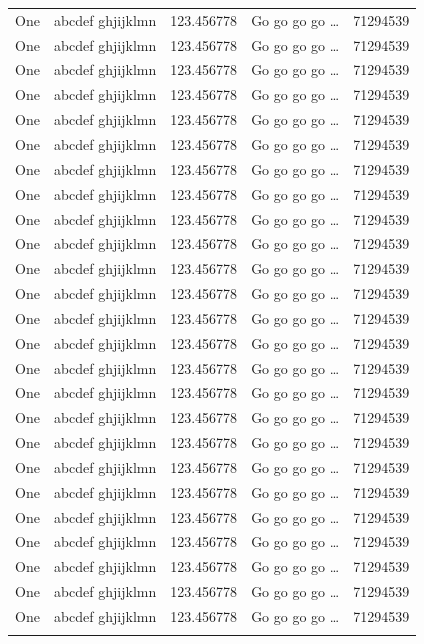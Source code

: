 \documentclass[phd,showgrids]{ndsu-thesis-2022}
\begin{document}
\begin{longtable}{l l l l r}
One & abcdef ghjijklmn & 123.456778  & Go go go go \ldots & \num{71294539}\\
One & abcdef ghjijklmn & 123.456778  & Go go go go \ldots & \num{71294539}\\
One & abcdef ghjijklmn & 123.456778  & Go go go go \ldots & \num{71294539}\\
One & abcdef ghjijklmn & 123.456778  & Go go go go \ldots & \num{71294539}\\
One & abcdef ghjijklmn & 123.456778  & Go go go go \ldots & \num{71294539}\\
One & abcdef ghjijklmn & 123.456778  & Go go go go \ldots & \num{71294539}\\
One & abcdef ghjijklmn & 123.456778  & Go go go go \ldots & \num{71294539}\\
One & abcdef ghjijklmn & 123.456778  & Go go go go \ldots & \num{71294539}\\
One & abcdef ghjijklmn & 123.456778  & Go go go go \ldots & \num{71294539}\\
One & abcdef ghjijklmn & 123.456778  & Go go go go \ldots & \num{71294539}\\
One & abcdef ghjijklmn & 123.456778  & Go go go go \ldots & \num{71294539}\\
One & abcdef ghjijklmn & 123.456778  & Go go go go \ldots & \num{71294539}\\
One & abcdef ghjijklmn & 123.456778  & Go go go go \ldots & \num{71294539}\\
One & abcdef ghjijklmn & 123.456778  & Go go go go \ldots & \num{71294539}\\
One & abcdef ghjijklmn & 123.456778  & Go go go go \ldots & \num{71294539}\\
One & abcdef ghjijklmn & 123.456778  & Go go go go \ldots & \num{71294539}\\
One & abcdef ghjijklmn & 123.456778  & Go go go go \ldots & \num{71294539}\\
One & abcdef ghjijklmn & 123.456778  & Go go go go \ldots & \num{71294539}\\
One & abcdef ghjijklmn & 123.456778  & Go go go go \ldots & \num{71294539}\\
One & abcdef ghjijklmn & 123.456778  & Go go go go \ldots & \num{71294539}\\
One & abcdef ghjijklmn & 123.456778  & Go go go go \ldots & \num{71294539}\\
One & abcdef ghjijklmn & 123.456778  & Go go go go \ldots & \num{71294539}\\
One & abcdef ghjijklmn & 123.456778  & Go go go go \ldots & \num{71294539}\\
One & abcdef ghjijklmn & 123.456778  & Go go go go \ldots & \num{71294539}\\
One & abcdef ghjijklmn & 123.456778  & Go go go go \ldots & \num{71294539}\\
\bottomrule
\label{lt:sim}
\end{longtable}
\endgroup
\end{document}
